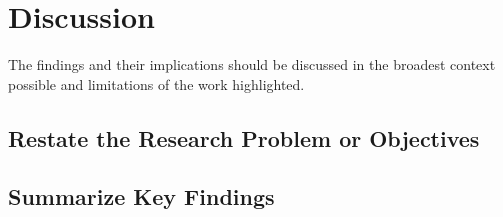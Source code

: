 \chapter{Discussion}
The findings and their implications should be discussed in the broadest context possible and limitations of the work highlighted.
\section{Restate the Research Problem or Objectives}
\section{Summarize Key Findings}


